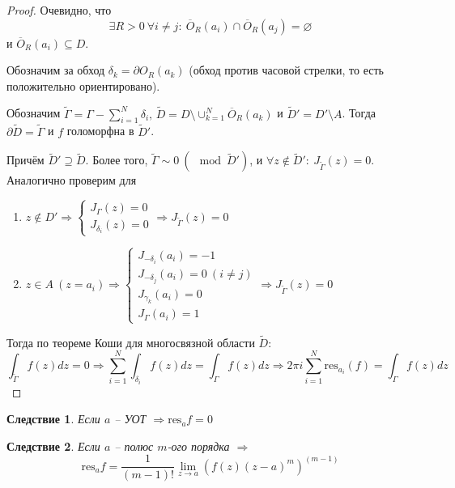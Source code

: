 \documentclass[a4paper,12pt]{article}
\renewcommand{\emptyset}{\ensuremath{\varnothing}}
\theoremstyle{plain}
\newtheorem*{corollary}{Следствие}
\theoremstyle{definition}
\theoremstyle{remark}
\begin{document}
\begin{proof}
	Очевидно, что
	\[
		\exists R > 0 \: \forall i \neq j :\: \overline{O}_R(a_i) \cap \overline{O}_R(a_j) = \emptyset
	\]
	и $\overline{O}_R(a_i) \subseteq D$.

	Обозначим за обход $\delta_k = \partial O_R(a_k)$ (обход против часовой стрелки, то есть положительно ориентировано).

	Обозначим $\tilde{\Gamma} = \Gamma - \sum_{i = 1}^N \delta_i,\, \tilde{D} = D \setminus \cup_{k = 1}^N \overline{O}_R(a_k)$ и $\tilde{D}' = D'
		\setminus A$. Тогда $\partial\tilde{D} = \tilde{\Gamma}$ и $f$ голоморфна в $\tilde{D}'$.

	Причём $\tilde{D}' \supseteq \tilde{D}$. Более того, $\tilde{\Gamma} \sim 0 \: (\mod \tilde{D}')$, и $\forall z \not\in \tilde{D}' :\: J_{\tilde{\Gamma}}(z) = 0$. Аналогично проверим для
	\begin{enumerate}
		\item $z \not\in D' \Rightarrow \begin{cases}
				      J_\Gamma(z) = 0 \\
				      J_{\delta_i}(z) = 0
			      \end{cases} \Rightarrow J_{\tilde{\Gamma}}(z) = 0$
		\item $z \in A \: (z = a_i) \Rightarrow \begin{cases}
				      J_{-\delta_i}(a_i) = -1              \\
				      J_{-\delta_j}(a_i) = 0 \: (i \neq j) \\
				      J_{\gamma_k}(a_i) = 0                \\
				      J_\Gamma(a_i) = 1
			      \end{cases} \Rightarrow J_{\tilde{\Gamma}}(z) = 0$
	\end{enumerate}
	Тогда по теореме Коши для многосвязной области $\tilde{D}$:
	\[
		\int_{\tilde{\Gamma}} f(z)dz = 0 \Rightarrow \sum_{i = 1}^N\int_{\delta_i}f(z)dz = \int_\Gamma f(z)dz \Rightarrow 2\pi i\sum_{i = 1}^N\text{res}_{a_i}(f) = \int_\Gamma f(z)dz
	\]
\end{proof}

\begin{corollary}
	Если $a$ -- УОТ $\Rightarrow \text{res}_af = 0$
\end{corollary}

\begin{corollary}
	Если $a$ -- полюс $m$-ого порядка $\Rightarrow$
	\[
		\text{res}_af = \frac{1}{(m - 1)!}\lim_{z \to a}\left(f(z)(z - a)^m\right)^{(m - 1)}
	\]
\end{corollary}
\end{document}
